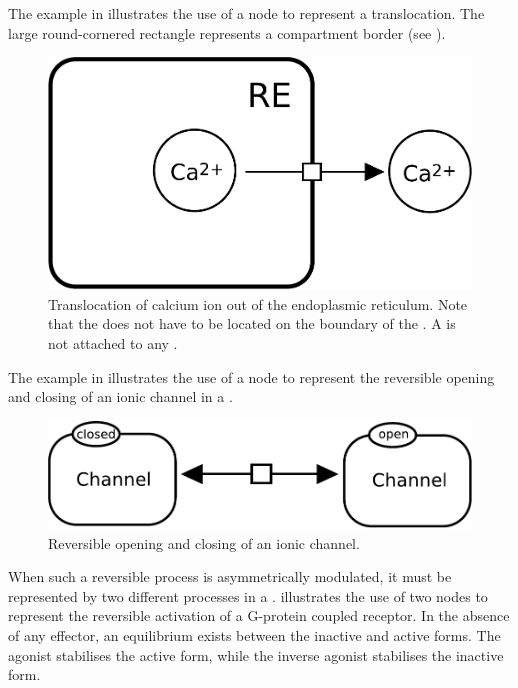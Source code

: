 The example in  illustrates the use of a  node to represent a translocation. The large round-cornered rectangle represents a compartment border (see ).

\begin{figure}[H]
  \centering
  \includegraphics[scale = 0.3]{examples/process-translocation}
  \caption{Translocation of calcium ion out of the endoplasmic reticulum. Note that the  does not have to be located on the boundary of the . A  is not attached to any .}
  \label{fig:trans-trans}
\end{figure}

The example in  illustrates the use of a  node to represent the reversible opening and closing of an ionic channel in a \PD.

\begin{figure}[H]
  \centering
  \includegraphics[scale = 0.3]{examples/process-reversible}
  \caption{Reversible opening and closing of an ionic channel.}
  \label{fig:trans-reverse}
\end{figure}

When such a reversible process is asymmetrically modulated, it must be represented by two different processes in a \PD.   illustrates the use of two  nodes to represent the reversible activation of a G-protein coupled receptor.  In the absence of any effector, an equilibrium exists between the inactive and active forms.  The agonist stabilises the active form, while the inverse agonist stabilises the inactive form.

